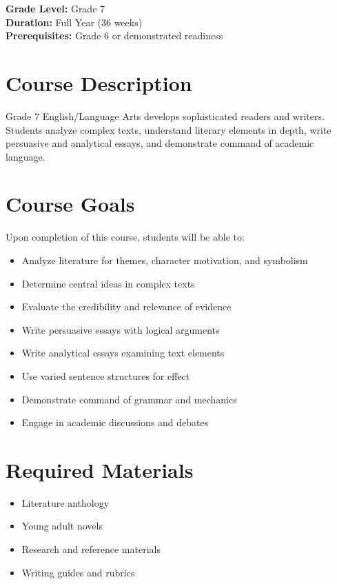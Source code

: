 \documentclass[11pt,letterpaper]{report}
\begin{document}
\textbf{Grade Level:} Grade 7\\
\textbf{Duration:} Full Year (36 weeks)\\
\textbf{Prerequisites:} Grade 6 or demonstrated readiness

\section{Course Description}

Grade 7 English/Language Arts develops sophisticated readers and writers. Students analyze complex texts, understand literary elements in depth, write persuasive and analytical essays, and demonstrate command of academic language.

\section{Course Goals}

Upon completion of this course, students will be able to:

\begin{itemize}
    \item Analyze literature for themes, character motivation, and symbolism
    \item Determine central ideas in complex texts
    \item Evaluate the credibility and relevance of evidence
    \item Write persuasive essays with logical arguments
    \item Write analytical essays examining text elements
    \item Use varied sentence structures for effect
    \item Demonstrate command of grammar and mechanics
    \item Engage in academic discussions and debates
\end{itemize}

\section{Required Materials}

\begin{itemize}
    \item Literature anthology
    \item Young adult novels
    \item Research and reference materials
    \item Writing guides and rubrics
\end{itemize}
\end{document}
